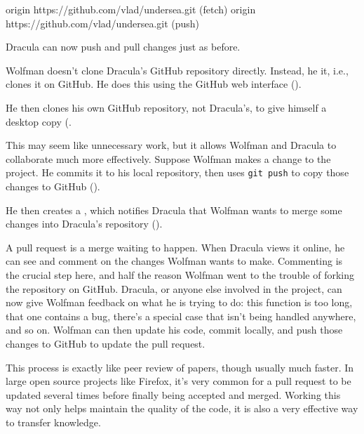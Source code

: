 \documentclass{book}
\begin{document}
\begin{VerbOut}
origin https://github.com/vlad/undersea.git (fetch)
origin https://github.com/vlad/undersea.git (push)
\end{VerbOut}

Dracula can now push and pull changes just as before.

Wolfman doesn't clone Dracula's GitHub repository directly. Instead, he
 it, i.e., clones it on GitHub. He
does this using the GitHub web interface ().


He then clones his own GitHub repository, not Dracula's, to give himself
a desktop copy (.

This may seem like unnecessary work, but it allows Wolfman and Dracula
to collaborate much more effectively. Suppose Wolfman makes a change to
the project. He commits it to his local repository, then uses
\texttt{git push} to copy those changes to GitHub ().



He then creates a , which
notifies Dracula that Wolfman wants to merge some changes into Dracula's
repository ().


A pull request is a merge waiting to happen. When Dracula views it
online, he can see and comment on the changes Wolfman wants to make.
Commenting is the crucial step here, and half the reason Wolfman went to
the trouble of forking the repository on GitHub. Dracula, or anyone else
involved in the project, can now give Wolfman feedback on what he is
trying to do: this function is too long, that one contains a bug,
there's a special case that isn't being handled anywhere, and so on.
Wolfman can then update his code, commit locally, and push those changes
to GitHub to update the pull request.

This process is exactly like peer review of papers, though usually much
faster. In large open source projects like Firefox, it's very common for
a pull request to be updated several times before finally being accepted
and merged. Working this way not only helps maintain the quality of the
code, it is also a very effective way to transfer knowledge.
\end{document}
